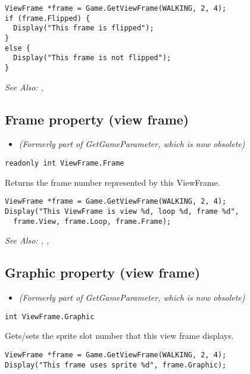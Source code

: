 \begin{verbatim}
ViewFrame *frame = Game.GetViewFrame(WALKING, 2, 4);
if (frame.Flipped) {
  Display("This frame is flipped");
}
else {
  Display("This frame is not flipped");
}
\end{verbatim}

\it{See Also:} ,


\subsection{Frame property (view frame)}\label{ViewFrame.Frame}%

\begin{itemize}
\item \it{(Formerly part of GetGameParameter, which is now obsolete)}
\end{itemize}

\begin{verbatim}
readonly int ViewFrame.Frame
\end{verbatim}
Returns the frame number represented by this ViewFrame.

\begin{verbatim}
ViewFrame *frame = Game.GetViewFrame(WALKING, 2, 4);
Display("This ViewFrame is view %d, loop %d, frame %d",
  frame.View, frame.Loop, frame.Frame);
\end{verbatim}

\it{See Also:} ,
,


\subsection{Graphic property (view frame)}\label{ViewFrame.Graphic}%

\begin{itemize}
\item \it{(Formerly part of GetGameParameter, which is now obsolete)}
\end{itemize}

\begin{verbatim}
int ViewFrame.Graphic
\end{verbatim}
Gets/sets the sprite slot number that this view frame displays.

\begin{verbatim}
ViewFrame *frame = Game.GetViewFrame(WALKING, 2, 4);
Display("This frame uses sprite %d", frame.Graphic);
\end{verbatim}

